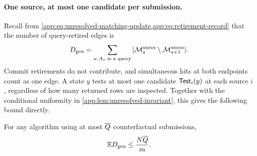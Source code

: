 \paragraph{One source, at most one candidate per submission.}
Recall from \cref{app:eq:unresolved-matching-update,app:eq:retirement-record}
that the number of query-retired edges is
\[
 \GenieDeletions
 =\sum_{s:\,A_s\text{ is a query}}
   |\OpUnresolvedMatching{s}\setminus\OpUnresolvedMatching{s+1}|.
\]
Commit retirements do not contribute, and simultaneous hits at both endpoints
count as one edge.
A state \(y\) tests at most one candidate \(\HardTest{y}{i}\) at each source
\(i\), regardless of how many returned rows are inspected.
Together with the conditional uniformity in
\cref{app:lem:unresolved-invariant}, this gives the following bound directly.

\begin{lemma}
\label{app:lem:query-disclosure}
For any algorithm using at most \(\QueryBudget{}\) counterfactual submissions,
\begin{equation}
 \mathbb E\GenieDeletions\le\frac{N\QueryBudget{}}{\HardBankSize}.
 \label{app:eq:expected-query-deletions}
\end{equation}
\end{lemma}

